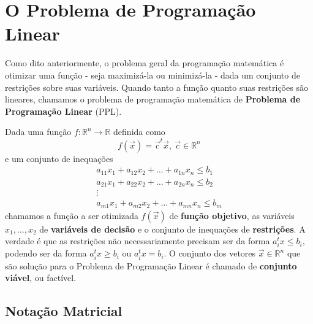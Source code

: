 \section{O Problema de Programação Linear}

Como dito anteriormente, o problema geral da programação matemática é otimizar
uma função - seja maximizá-la ou minimizá-la - dada um conjunto de restrições
sobre suas variáveis. Quando tanto a função quanto suas restrições são lineares,
chamamos o problema de programação matemática de \textbf{Problema de Programação Linear} (PPL).

Dada uma função $f: \mathbb{R}^n \to \mathbb{R}$ definida como \[f(\vec x) = \vec c^t \vec x,\ \vec c \in \mathbb{R}^n\]e um conjunto de inequações
\begin{gather*}
	a_{11}x_1 + a_{12}x_2 + \ldots + a_{1n}x_n \leq b_1 \\
	a_{21}x_1 + a_{22}x_2 + \ldots + a_{2n}x_n \leq b_2 \\
	\vdots \\
	a_{m1}x_1 + a_{m2}x_2 + \ldots + a_{mn}x_n \leq b_m
\end{gather*}
chamamos a função a ser otimizada $f(\vec x)$ de \textbf{função objetivo}, as
variáveis $x_1, \ldots, x_2$ de \textbf{variáveis de decisão} e o conjunto de
inequações de \textbf{restrições}. A verdade é que as restrições não necessariamente
precisam ser da forma $a^t_i x \leq b_i$, podendo ser da forma $a^t_i x \geq b_i$
ou  $a^t_i x = b_i$. O conjunto dos vetores $\vec x \in \mathbb{R}^n$ que são solução
para o Problema de Programação Linear é chamado de \textbf{conjunto viável}, ou factível.

\subsection{Notação Matricial}

